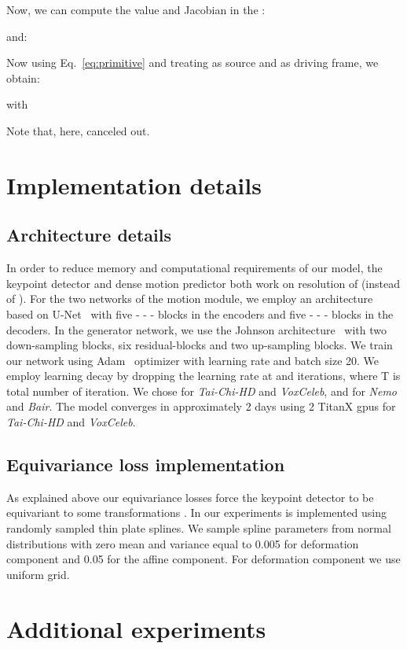 \documentclass{article}
\begin{document}
Now, we can compute the value and Jacobian in the :

and:

Now using Eq.~\eqref{eq:primitive} and treating  as source and  as driving frame, we obtain:


with

Note that, here,   canceled out.


\section{Implementation details}
\label{sec:details}
\subsection{Architecture details}
In order to reduce memory and computational requirements of our model, the keypoint detector and dense motion predictor both work on resolution of  (instead of ). For the two networks of the motion  module, we employ an architecture based on U-Net~\cite{ronneberger2015u} with five  -  -  -  blocks in the encoders and five  -  -  -  blocks in the decoders. In the generator network, we use the Johnson architecture~\cite{johnson2016perceptual} with two down-sampling blocks, six residual-blocks and two up-sampling blocks. We train our network using Adam~\cite{kingma2014adam} optimizer with learning rate  and batch size 20. We employ learning decay by dropping the learning rate at  and  iterations, where T is total number of iteration. We chose  for \emph{Tai-Chi-HD} and \emph{VoxCeleb}, and  for \emph{Nemo} and \emph{Bair}. The model converges in approximately 2 days using 2 TitanX gpus for \emph{Tai-Chi-HD} and \emph{VoxCeleb}.

\subsection{Equivariance loss implementation}
As explained above our equivariance losses force the keypoint detector to be equivariant to some transformations . In our experiments  is implemented using randomly sampled thin plate splines. We sample spline parameters from normal distributions with zero mean and variance equal to 0.005 for deformation component and 0.05 for the affine component. For deformation component we use uniform  grid.

\section{Additional experiments}
\label{sec:expadd}
\end{document}
